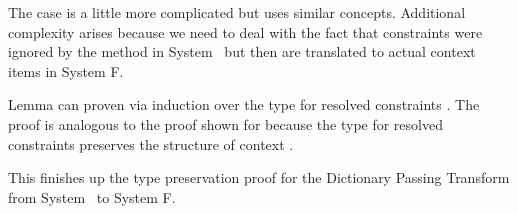 \noindent The case    is a little more complicated but uses similar concepts.
Additional complexity arises because we need to deal with the fact that constraints were ignored by the  method in System \Fo\ but then are translated to actual context items in System F.

\noindent Lemma  can proven via induction over the type for resolved constraints \Data{[}  \Data{]∈} . 
The proof is analogous to the proof shown for  because the type for resolved constraints preserves the structure of context . 

\noindent This finishes up the type preservation proof for the Dictionary Passing Transform from System \Fo\ to System F.